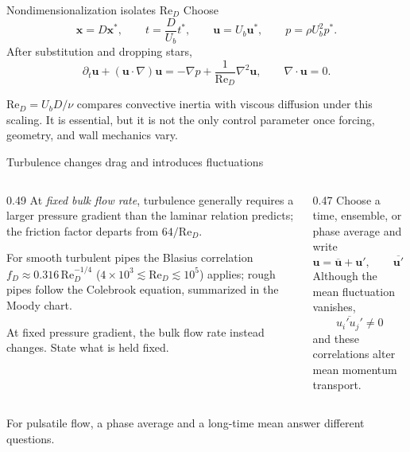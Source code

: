 \documentclass[aspectratio=169,11pt]{beamer}
\newcommand{\Rey}{\mathrm{Re}}
\newcommand{\uu}{\bm{u}}
\newcommand{\xvec}{\bm{x}}
\newcommand{\mean}[1]{\overline{#1}}
\begin{document}
\begin{frame}{Nondimensionalization isolates $\Rey_D$}
Choose
\[
  \xvec=D\xvec^*,
  \qquad t=\frac D{U_b}t^*,
  \qquad \uu=U_b\uu^*,
  \qquad p=\rho U_b^2p^*.
\]
After substitution and dropping stars,
\[
  \partial_t\uu+(\uu\cdot\nabla)\uu
  =-\nabla p+\frac1{\Rey_D}\nabla^2\uu,
  \qquad \nabla\cdot\uu=0.
\]

\begin{punchbox}
$\Rey_D=U_bD/\nu$ compares convective inertia with viscous diffusion under this scaling. It is essential, but it is not the only control parameter once forcing, geometry, and wall mechanics vary.
\end{punchbox}
\end{frame}

\begin{frame}{Turbulence changes drag and introduces fluctuations}
\begin{columns}[T,onlytextwidth]
\begin{column}{0.49\textwidth}
At \emph{fixed bulk flow rate}, turbulence generally requires a larger pressure gradient than the laminar relation predicts; the friction factor departs from $64/\Rey_D$.

For smooth turbulent pipes the Blasius correlation $f_D\approx0.316\,\Rey_D^{-1/4}$ ($4\times10^3\lesssim\Rey_D\lesssim10^5$) applies; rough pipes follow the Colebrook equation, summarized in the Moody chart.

At fixed pressure gradient, the bulk flow rate instead changes. State what is held fixed.
\end{column}
\begin{column}{0.47\textwidth}
Choose a time, ensemble, or phase average and write
\[
  \uu=\mean{\uu}+\uu',
  \qquad \mean{\uu'}=0.
\]
Although the mean fluctuation vanishes,
\[
  \mean{u_i'u_j'}\ne0
\]
and these correlations alter mean momentum transport.
\end{column}
\end{columns}

\begin{punchbox}
For pulsatile flow, a phase average and a long-time mean answer different questions.
\end{punchbox}
\end{frame}
\end{document}
